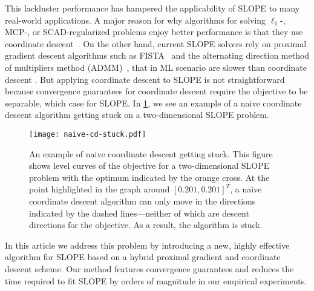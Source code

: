 This lackluster performance has hampered the applicability of SLOPE to many
real-world applications. %
A major reason for why algorithms for solving $\ell_1$-, MCP-, or SCAD-regularized problems enjoy better
performance is that they use coordinate
descent~\cite{tseng2001convergence,friedman2010,breheny2011}.
On the other hand, current SLOPE solvers rely on proximal gradient descent
algorithms such as FISTA~\cite{beck2009} and the
alternating direction method of multipliers method (ADMM)~\cite{boyd2010}, that in ML scenario are slower than coordinate descent \cite{moreau2022benchopt}.
But applying coordinate descent to SLOPE is not straightforward because
convergence guarantees for coordinate descent require the objective to be
separable, which case for SLOPE. In \cref{fig:naive-cd-stuck}, we see an
example of a naive coordinate descent algorithm getting stuck on a
two-dimensional SLOPE problem.

\begin{figure}[htpb]
  \centering
  \texttt{[image: naive-cd-stuck.pdf]}
  \caption{%
    An example of naive coordinate descent getting stuck. This figure shows
    level curves of the objective for a two-dimensional SLOPE problem with the
    optimum indicated by the orange cross. At the point highlighted in the
    graph around \([0.201,0.201]^T\), a naive coordinate descent algorithm can
    only move in the directions indicated by the dashed lines---neither of which
    are descent directions for the objective. As a result, the algorithm is
    stuck.
  }
  \label{fig:naive-cd-stuck}
\end{figure}


In this article we address this problem by introducing a new, highly effective
algorithm for SLOPE based on a hybrid proximal gradient and coordinate descent
scheme. Our method features convergence guarantees and reduces the time
required to fit SLOPE by orders of magnitude in our empirical experiments.
